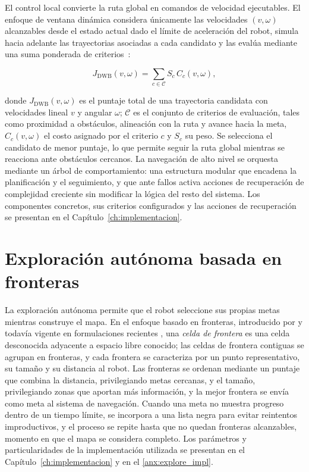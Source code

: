 El control local convierte la ruta global en comandos de velocidad
ejecutables. El enfoque de ventana dinámica considera únicamente las
velocidades $(v,\omega)$ alcanzables desde el estado actual dado el límite
de aceleración del robot, simula hacia adelante las trayectorias asociadas a
cada candidato y las evalúa mediante una suma ponderada de criterios~\citep[Sec.~III-A]{macenski2023desks}:

\begin{equation}
J_{\mathrm{DWB}}(v,\omega)
=
\sum_{c\in\mathcal{C}}
S_c\,C_c(v,\omega),
\label{eq:costo_ctrl_local}
\end{equation}

\noindent donde $J_{\mathrm{DWB}}(v,\omega)$ es el puntaje total de una
trayectoria candidata con velocidades lineal $v$ y angular $\omega$;
$\mathcal{C}$ es el conjunto de criterios de evaluación, tales como
proximidad a obstáculos, alineación con la ruta y avance hacia la meta,
$C_c(v,\omega)$ el costo asignado por el criterio $c$ y $S_c$ su peso. Se
selecciona el candidato de menor puntaje, lo que permite seguir la ruta
global mientras se reacciona ante obstáculos cercanos. La navegación de alto
nivel se orquesta mediante un árbol de comportamiento: una estructura
modular que encadena la planificación y el seguimiento, y que ante fallos
activa acciones de recuperación de complejidad creciente sin modificar la
lógica del resto del sistema. Los componentes concretos, sus criterios
configurados y las acciones de recuperación se presentan en el
Capítulo~\ref{ch:implementacion}.

\section{Exploración autónoma basada en fronteras}
\label{sec:exploracion_marco}

La exploración autónoma permite que el robot seleccione sus propias metas
mientras construye el mapa. En el enfoque basado en fronteras, introducido por \citet{yamauchi1997frontier}
y todavía vigente en formulaciones recientes \citep{liu2025frontier}, una
\emph{celda de frontera} es una celda desconocida adyacente  a espacio libre conocido; las celdas de frontera
contiguas se agrupan en fronteras, y cada frontera se caracteriza por un
punto representativo, su tamaño y su distancia al robot. Las fronteras se
ordenan mediante un puntaje que combina la distancia, privilegiando metas
cercanas, y el tamaño, privilegiando zonas que aportan más información,
y la mejor frontera se envía como meta al sistema de navegación. Cuando una
meta no muestra progreso dentro de un tiempo límite, se incorpora a una
lista negra para evitar reintentos improductivos, y el proceso se repite
hasta que no quedan fronteras alcanzables, momento en que el mapa se
considera completo. Los parámetros y particularidades de la implementación
utilizada se presentan en el Capítulo~\ref{ch:implementacion} y en el
\ref{anx:explore_impl}.

